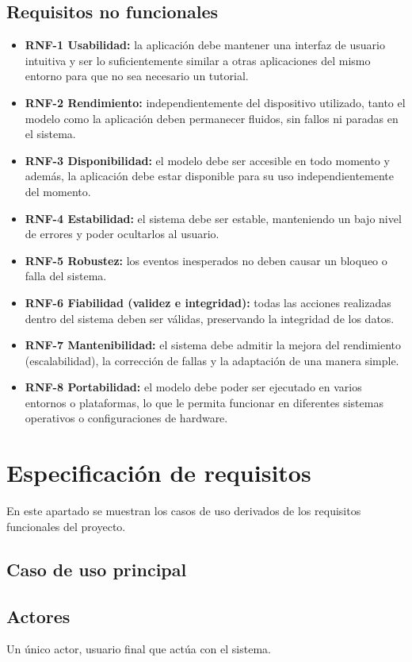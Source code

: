 \subsection{Requisitos no funcionales}

\begin{itemize}
    \item \textbf{RNF-1 Usabilidad:} la aplicación debe mantener una interfaz de usuario intuitiva y ser lo suficientemente similar a otras aplicaciones del mismo entorno para que no sea necesario un tutorial.
    \item \textbf{RNF-2 Rendimiento:} independientemente del dispositivo utilizado, tanto el modelo como la aplicación deben permanecer fluidos, sin fallos ni paradas en el sistema.
    \item \textbf{RNF-3 Disponibilidad:} el modelo debe ser accesible en todo momento y además, la aplicación debe estar disponible para su uso independientemente del momento.
    \item \textbf{RNF-4 Estabilidad:} el sistema debe ser estable, manteniendo un bajo nivel de errores y poder ocultarlos al usuario.
    \item \textbf{RNF-5 Robustez:} los eventos inesperados no deben causar un bloqueo o falla del sistema.
    \item \textbf{RNF-6 Fiabilidad (validez e integridad):} todas las acciones realizadas dentro del sistema deben ser válidas, preservando la integridad de los datos.
    \item \textbf{RNF-7 Mantenibilidad:} el sistema debe admitir la mejora del rendimiento (escalabilidad), la corrección de fallas y la adaptación de una manera simple.
    \item \textbf{RNF-8 Portabilidad:} el modelo debe poder ser ejecutado en varios entornos o plataformas, lo que le permita funcionar en diferentes sistemas operativos o configuraciones de hardware.
\end{itemize}



\section{Especificación de requisitos}

En este apartado se muestran los casos de uso derivados de los requisitos funcionales del proyecto.

\subsection{Caso de uso principal}


\subsection{Actores}

Un único actor, usuario final que actúa con el sistema.

